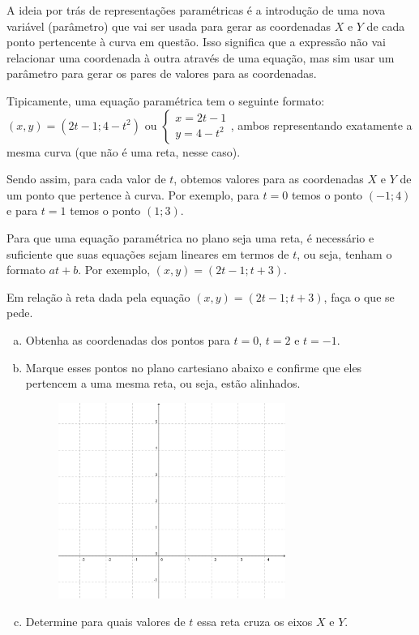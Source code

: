 \documentclass[main.tex]{subfiles}
\begin{document}
A ideia por trás de representações paramétricas é a introdução de uma nova variável (parâmetro) que vai ser usada para gerar as coordenadas $X$ e $Y$ de cada ponto pertencente à curva em questão. Isso significa que a expressão não vai relacionar uma coordenada à outra através de uma equação, mas sim usar um parâmetro para gerar os pares de valores para as coordenadas.

Tipicamente, uma equação paramétrica tem o seguinte formato: $(x,y)=(2t-1;4-t^2)$ ou $\begin{cases} x=2t-1 \\ y=4-t^2 \end{cases}$, ambos representando exatamente a mesma curva (que não é uma reta, nesse caso).

Sendo assim, para cada valor de $t$, obtemos valores para as coordenadas $X$ e $Y$ de um ponto que pertence à curva. Por exemplo, para $t=0$ temos o ponto $(-1;4)$ e para $t=1$ temos o ponto $(1;3)$.

Para que uma equação paramétrica no plano seja uma reta, é necessário e suficiente que suas equações sejam lineares em termos de $t$, ou seja, tenham o formato $at+b$. Por exemplo, $(x,y)=(2t-1;t+3)$.

\begin{questao}
Em relação à reta dada pela equação $(x,y)=(2t-1;t+3)$, faça o que se pede.
\begin{enumerate}[a)]
\item Obtenha as coordenadas dos pontos para $t=0$, $t=2$ e $t=-1$.
\item Marque esses pontos no plano cartesiano abaixo e confirme que eles pertencem a uma mesma reta, ou seja, estão alinhados.

\begin{figure}[h]
\centering
\includegraphics[width=0.7\textwidth]{./img/c6q10.png}
\end{figure}

\item Determine para quais valores de $t$ essa reta cruza os eixos $X$ e $Y$.
\end{enumerate} 
\end{questao}
\end{document}
